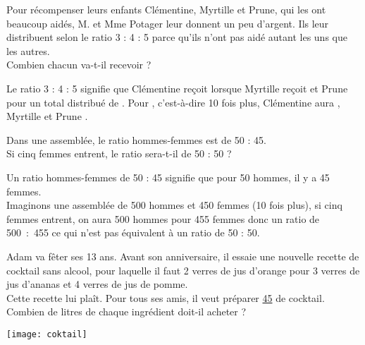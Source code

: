 \begin{colonne*exercice}
\bigskip


\begin{exercice} %
   Pour récompenser leurs enfants Clémentine, Myrtille et Prune, qui les ont beaucoup aidés, M. et Mme Potager leur donnent un peu d'argent. Ils leur distribuent  selon le ratio 3 : 4 : 5 parce qu'ils n'ont pas aidé autant les uns que les autres. \\
   Combien chacun va-t-il recevoir ?
\end{exercice}

\begin{corrige}
   Le ratio 3 : 4 : 5 signifie que Clémentine reçoit  lorsque Myrtille reçoit  et Prune  pour un total distribué de . Pour , c'est-à-dire 10 fois plus, {\blue Clémentine aura , Myrtille  et Prune }. \medskip
\end{corrige}

\bigskip


\begin{exercice} %
   Dans une assemblée, le ratio hommes-femmes est de 50 : 45. \\
   Si cinq femmes entrent, le ratio sera-t-il de 50 : 50 ?
\end{exercice}

\begin{corrige}
   Un ratio hommes-femmes de 50 : 45 signifie que pour 50 hommes, il y a 45 femmes. \\
   Imaginons une assemblée de 500 hommes et 450 femmes (10 fois plus), si cinq femmes entrent, on aura 500 hommes pour 455 femmes donc un ratio de 500~:~455 ce qui n'est {\blue pas équivalent à un ratio de 50 : 50.} \medskip
\end{corrige}

\bigskip


\begin{exercice} %
   Adam va fêter ses 13 ans. Avant son anniversaire, il essaie une nouvelle recette de cocktail sans alcool, pour laquelle il faut 2 verres de jus d'orange pour 3 verres de jus d'ananas et 4 verres de jus de pomme. \\
   Cette recette lui plaît. Pour tous ses amis, il veut préparer \ul{45} de cocktail. \\
   Combien de litres de chaque ingrédient doit-il acheter ?
   \begin{center}
      \texttt{[image: coktail]}
   \end{center}
\end{exercice}


\end{colonne*exercice}
